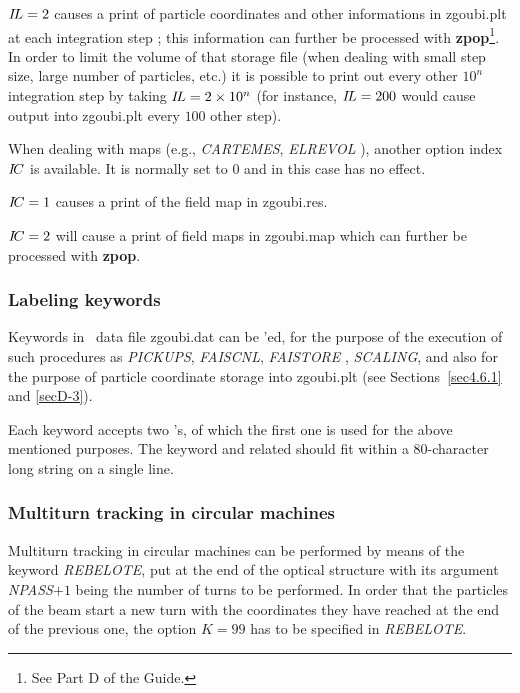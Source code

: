 \noindent $ I\!L=2 $ causes a print   of particle coordinates and other 
informations in zgoubi.plt at each integration step ; this information 
 can further be processed with 
\textbf{zpop}\footnote{See Part D of the Guide.}. In order to limit the volume of 
that storage file (when dealing with small step size, large number of particles, etc.) it is possible 
to print out  every other $10^n$ integration step by taking $ I\!L=2 \times 10^n $ (for instance, 
 $ I\!L=200 $ would cause output into zgoubi.plt every $100$ other step). 
\bigskip

\noindent When dealing with maps (e.g., \textsl{CARTEMES}, \textsl{ELREVOL
}), another option index $ I\!C $ is available.
  It is normally set to 0 and in this case has no effect.
 
\noindent $ I\!C=1 $ causes a print of the field map in zgoubi.res. 

\noindent $ I\!C=2 $ will cause a print   of field maps in zgoubi.map 
which can further be processed with \textbf{zpop}. 

\newpage

 \subsubsection{Labeling keywords}\label{sec4.6.8}

Keywords in \zgou\ data file zgoubi.dat can be \LABEL'ed, for the purpose of 
the execution of such procedures as  \textsl{PICKUPS}, \textsl{FAISCNL}, \textsl{FAISTORE}
, \textsl{SCALING}, and also for the purpose of 
particle coordinate storage into zgoubi.plt (see Sections~\ref{sec4.6.1} 
and \ref{secD-3}). 

\noindent Each keyword accepts two \LABEL's, of which the first one is used for the 
above mentioned purposes. The keyword and related \LABEL['s] should fit within a 80-character 
long string on a single line. 

\subsubsection{Multiturn tracking in circular machines} \label{sec4.6.5}

Multiturn tracking  in circular machines can be performed by
means of the keyword \textsl{REBELOTE}, put at the end of the optical structure 
with its argument \textsl{NPASS}$+1$ being the number of turns to be 
performed. In order that the \IMAX{} particles of the beam start a new 
turn with the coordinates they have reached at the end of the 
previous one, the option $ K=99 $ has to be specified in \textsl{REBELOTE}.
\bigskip

